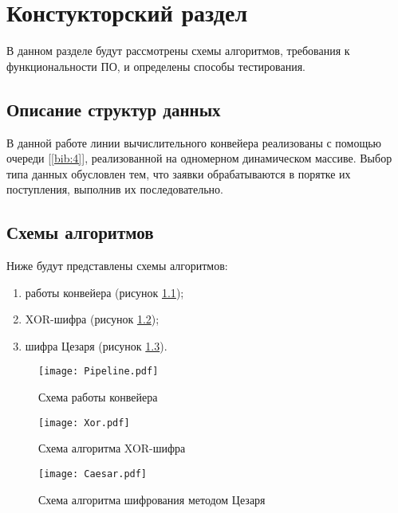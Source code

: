 \chapter{ Констукторский раздел}
\label{cha:design}
    В данном разделе будут рассмотрены схемы алгоритмов, требования к функциональности ПО, и определены способы тестирования.
    
    \section{Описание структур данных}
        В данной работе линии вычислительного конвейера реализованы с помощью очереди [\ref{bib:4}], реализованной на одномерном динамическом массиве. Выбор типа данных обусловлен тем, что заявки обрабатываются в порятке их поступления, выполнив их последовательно.
	
	\section{Схемы алгоритмов}
        Ниже будут представлены схемы алгоритмов: \begin{enumerate}
            \item работы конвейера (рисунок \ref{schema:Pipeline});
            \item XOR-шифра (рисунок \ref{schema:Xor});
            \item шифра Цезаря (рисунок \ref{schema:Caesar}).
        \end{enumerate}
      
       	    \begin{figure}[h!]
       		\centering
       		\texttt{[image: Pipeline.pdf]}
       		\caption{Схема работы конвейера}
       		\label{schema:Pipeline}
       	\end{figure}\clearpage
        \begin{figure}[h!]
            \centering
            \texttt{[image: Xor.pdf]}
            \caption{Схема алгоритма XOR-шифра}
            \label{schema:Xor}
        \end{figure}\clearpage
        \begin{figure}[h!]
            \centering
            \texttt{[image: Caesar.pdf]}
            \caption{Схема алгоритма шифрования методом Цезаря}
            \label{schema:Caesar}
        \end{figure}\clearpage

        

